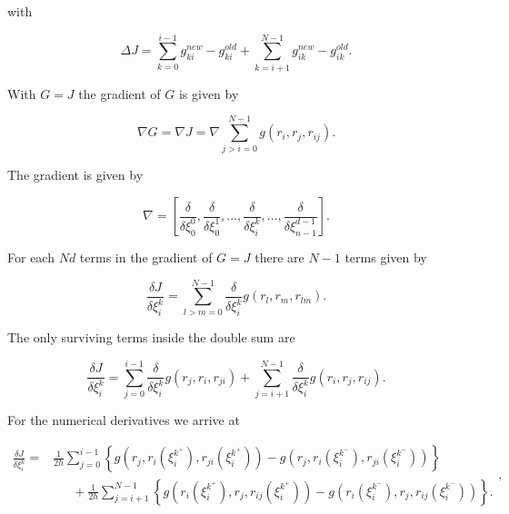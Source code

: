 with

\begin{equation*}
  \Delta J = \sum_{k=0}^{i-1} g_{ki}^{new}-g_{ki}^{old} 
  + \sum_{k=i+1}^{N-1} g_{ik}^{new}-g_{ik}^{old}.
\end{equation*}

With $G=J$ the gradient of $G$ is given by

\begin{equation}
  \nabla G = \nabla J = \nabla \sum_{j>i=0}^{N-1} g(r_i, r_j, r_{ij}).
\label{gradJ}
\end{equation}

The gradient is given by

\begin{equation*}
  \nabla = \left[ \frac{\delta}{\delta \xi_0^0}, \frac{\delta}{\delta
  \xi_0^1}, \dots,  \frac{\delta}{\delta \xi_i^k}, \dots,
  \frac{\delta}{\delta \xi_{n-1}^{d-1}}\right].
\end{equation*}

For each $Nd$ terms in the gradient of $G=J$ there are $N-1$ terms
given by

\begin{equation*}
  \frac{\delta J}{\delta \xi_i^k} = \sum_{l>m=0}^{N-1}
  \frac{\delta}{\delta \xi_i^k} g(r_l, r_m, r_{lm}).
\end{equation*}

The only surviving terms inside the double sum are

\begin{equation*}
  \frac{\delta J}{\delta \xi_i^k}  = \sum_{j=0}^{i-1}
  \frac{\delta}{\delta \xi_i^k} g(r_j, r_i, r_{ji}) 
  + \sum_{j=i+1}^{N-1}
  \frac{\delta}{\delta \xi_i^k} g(r_i, r_j, r_{ij}).
\end{equation*}

For the numerical derivatives we arrive at

\begin{equation}
  \left. \begin{split}
    \frac{\delta J}{\delta \xi_i^k}  = 
    &\frac{1}{2h} \sum_{j=0}^{i-1}
    \left\{ g(r_j, r_i(\xi_i^{k^+}), r_{ji}(\xi_i^{k^+})) 
    -  g(r_j, r_i(\xi_i^{k^-}), r_{ji}(\xi_i^{k^-})) \right\}\\
    &\phantom{AA}+ \frac{1}{2h}\sum_{j=i+1}^{N-1} 
    \left\{ g(r_i(\xi_i^{k^+}), r_j, r_{ij}(\xi_i^{k^+})) 
    - g(r_i(\xi_i^{k^-}), r_j, r_{ij}(\xi_i^{k^-})) \right\}.
  \end{split} \right.,
\label{firstDerivativeJ}
\end{equation}

